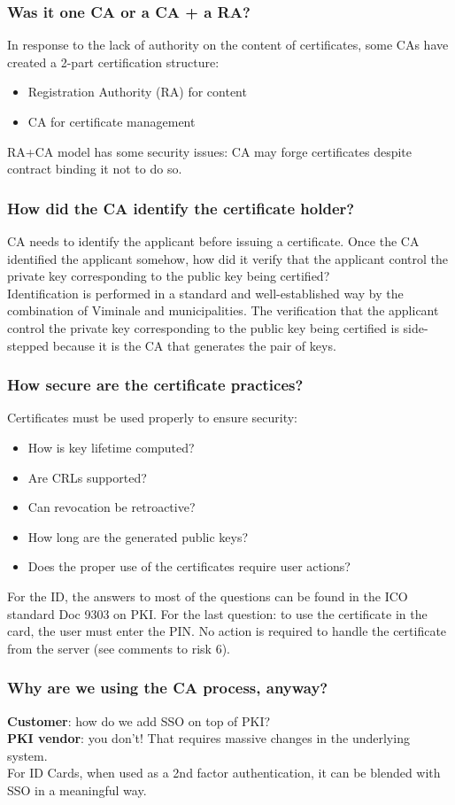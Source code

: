 \documentclass[a4paper, 10pt, titlepage]{article}
\begin{document}
\subsubsection*{Was it one CA or a CA + a RA?}
In response to the lack of authority on the content of certificates, some CAs have created a 2-part certification structure:
\begin{itemize}
\item Registration Authority (RA) for content
\item CA for certificate management
\end{itemize}
RA+CA model has some security issues: CA may forge certificates despite contract binding it not to do so.
\subsubsection*{How did the CA identify the certificate holder?}
CA needs to identify the applicant before issuing a certificate. Once the CA identified the applicant somehow, how did it verify that the applicant control the private key corresponding to the public key
being certified? \medskip\\
Identification is performed in a standard and well-established way by the combination of Viminale and municipalities. The verification that the applicant control the private key corresponding to the public key being certified is side-stepped because it is the CA that generates the pair of keys.
\subsubsection*{How secure are the certificate practices?}
Certificates must be used properly to ensure security:
\begin{itemize}
\item How is key lifetime computed?
\item Are CRLs supported?
\item Can revocation be retroactive?
\item How long are the generated public keys?
\item Does the proper use of the certificates require user actions?
\end{itemize} \medskip
For the ID, the answers to most of the questions can be found in the ICO standard Doc 9303 on PKI. For the last question: to use the certificate in the card, the user must enter the PIN. No action is required to handle the certificate from the server (see comments to risk 6).
\subsubsection*{Why are we using the CA process, anyway?}
\textbf{Customer}: how do we add SSO on top of PKI?\\
\textbf{PKI vendor}: you don’t! That requires massive changes in the underlying system. \medskip\\
For ID Cards, when used as a 2nd factor authentication, it can be blended with SSO in a meaningful way.
\end{document}
